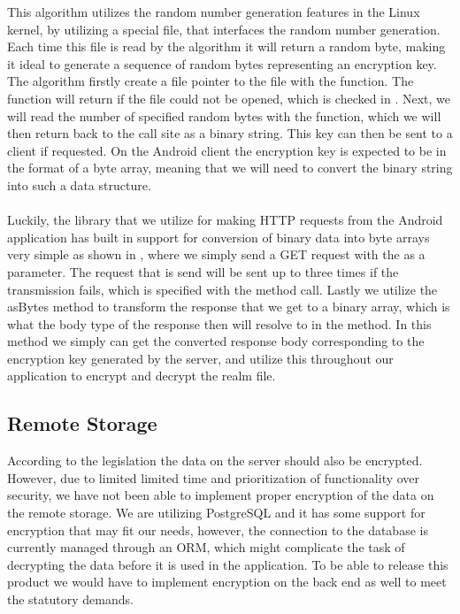 This algorithm utilizes the random number generation features in the Linux kernel, by utilizing a special file,  that interfaces the random number generation. Each time this file is read by the algorithm it will return a random byte, making it ideal to generate a sequence of random bytes representing an encryption key. The algorithm firstly create a file pointer to the  file with the  function. The function will return  if the file could not be opened, which is checked in . Next, we will read the number of specified random bytes with the  function, which we will then return back to the call site as a binary string. This key can then be sent to a client if requested. On the Android client the encryption key is expected to be in the format of a byte array, meaning that we will need to convert the binary string into such a data structure. 
\\\\
Luckily, the library that we utilize for making HTTP requests from the Android application has built in support for conversion of binary data into byte arrays very simple as shown in , where we simply send a GET request with the  as a parameter. The request that is send will be sent up to three times if the transmission fails, which is specified with the  method call. Lastly we utilize the asBytes method to transform the response that we get to a binary array, which is what the body type of the response then will resolve to in the  method. In this method we simply can get the converted response body corresponding to the encryption key generated by the server, and utilize this throughout our application to encrypt and decrypt the realm file.    



\subsection{Remote Storage}
\label{sub:remote_storage}

According to the legislation the data on the server should also be encrypted. However, due to limited limited time and prioritization of functionality over security, we have not been able to implement proper encryption of the data on the remote storage. We are utilizing PostgreSQL and it has some support for encryption that may fit our needs, however, the connection to the database is currently managed through an ORM, which might complicate the task of decrypting the data before it is used in the application. To be able to release this product we would have to implement encryption on the back end as well to meet the statutory demands.
